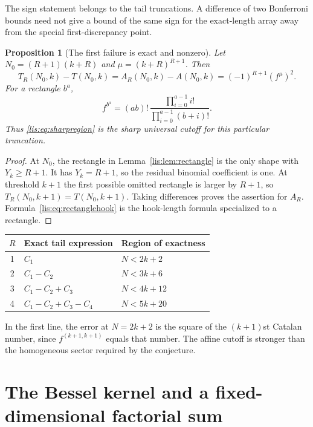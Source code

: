\documentclass[11pt,letterpaper]{article}
\numberwithin{equation}{section}
\newtheorem{proposition}[theorem]{Proposition}
\theoremstyle{definition}
\begin{document}
The sign statement belongs to the tail truncations. A difference of two
Bonferroni bounds need not give a bound of the same sign for the
exact-length array away from the special first-discrepancy point.

\begin{proposition}[The first failure is exact and nonzero]\label{lis:prop:firstfailure}
Let $N_0=(R+1)(k+R)$ and $\mu=(k+R)^{R+1}$. Then
\begin{equation}
 T_R(N_0,k)-T(N_0,k)
 =A_R(N_0,k)-A(N_0,k)
 =(-1)^{R+1}(f^\mu)^2.\label{lis:eq:firstfailure}
\end{equation}
For a rectangle $b^a$,
\begin{equation}
 f^{b^a}=(ab)!\,\frac{\prod_{i=0}^{a-1}i!}
                           {\prod_{i=0}^{a-1}(b+i)!}.
 \label{lis:eq:rectanglehook}
\end{equation}
Thus \eqref{lis:eq:sharpregion} is the sharp universal cutoff for this
particular truncation.
\end{proposition}
\begin{proof}
At $N_0$, the rectangle in Lemma~\ref{lis:lem:rectangle} is the only shape
with $Y_k\ge R+1$. It has $Y_k=R+1$, so the residual binomial coefficient
is one. At threshold $k+1$ the first possible omitted rectangle is
larger by $R+1$, so $T_R(N_0,k+1)=T(N_0,k+1)$. Taking differences
proves the assertion for $A_R$. Formula~\eqref{lis:eq:rectanglehook}
is the hook-length formula specialized to a rectangle.
\end{proof}

\begin{center}
\begin{tabular}{@{}cll@{}}
\toprule
$R$ & Exact tail expression & Region of exactness\\
\midrule
1 & $C_1$ & $N<2k+2$\\
2 & $C_1-C_2$ & $N<3k+6$\\
3 & $C_1-C_2+C_3$ & $N<4k+12$\\
4 & $C_1-C_2+C_3-C_4$ & $N<5k+20$\\
\bottomrule
\end{tabular}
\end{center}
In the first line, the error at $N=2k+2$ is the square of the
$(k+1)$st Catalan number, since $f^{(k+1,k+1)}$ equals that number.
The affine cutoff is stronger than the homogeneous sector required
by the conjecture.

\section{The Bessel kernel and a fixed-dimensional factorial sum}
\end{document}
